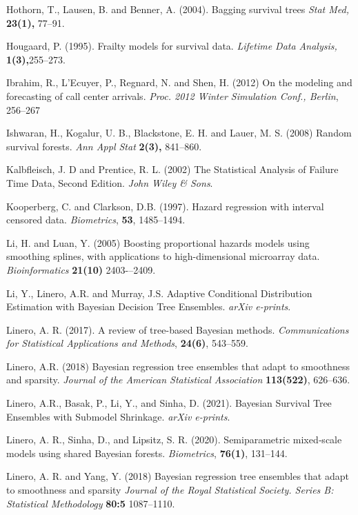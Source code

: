 \documentclass[11pt]{article}
\begin{document}
\begin{thebibliography}{}
\bibitem{ }	Hothorn, T., Lausen, B. and Benner, A. (2004). Bagging survival trees \textit{Stat Med,} \textbf{23(1),} 77--91.

\bibitem{ }	Hougaard, P. (1995). Frailty models for survival data. \textit{Lifetime Data Analysis,} \textbf{1(3),}255--273.

\bibitem{ } Ibrahim, R., L’Ecuyer, P., Regnard, N. and Shen, H. (2012) On the modeling
and forecasting of call center arrivals. \textit{Proc. 2012 Winter Simulation
Conf., Berlin}, 256--267

\bibitem{ }	 Ishwaran, H., Kogalur, U. B., Blackstone, E. H. and Lauer, M. S. (2008) Random survival forests. \textit{Ann Appl Stat} \textbf{2(3),} 841--860.

\bibitem{ } Kalbfleisch, J. D and Prentice, R. L. (2002) The Statistical Analysis of Failure Time Data, Second Edition. \textit{John Wiley \& Sons}.

\bibitem{ } Kooperberg, C. and Clarkson, D.B. (1997). Hazard regression with interval censored data.
\textit{Biometrics}, \textbf{53}, 1485--1494.

\bibitem{ }	 Li, H. and Luan, Y. (2005) Boosting proportional hazards models using smoothing splines, with applications to high-dimensional microarray data. \textit{Bioinformatics} \textbf{21(10)} 2403-–2409.	 

\bibitem{ } Li, Y., Linero, A.R. and Murray, J.S. Adaptive Conditional Distribution Estimation with Bayesian Decision Tree Ensembles. \textit{arXiv e-prints}.

\bibitem{ } Linero, A. R. (2017). A review of tree-based Bayesian methods. \textit{Communications for Statistical Applications and Methods}, \textbf{24(6)}, 543--559.

\bibitem{ } Linero, A.R. (2018) Bayesian regression tree ensembles that adapt to smoothness and sparsity. \textit{Journal of the American Statistical Association} \textbf{113(522)}, 626--636.

\bibitem{ } Linero, A.R., Basak, P., Li, Y., and Sinha, D. (2021). Bayesian Survival Tree Ensembles with Submodel Shrinkage. \textit{arXiv e-prints}.

\bibitem{ } Linero, A. R., Sinha, D., and Lipsitz, S. R. (2020). Semiparametric mixed‐scale models using shared Bayesian forests. \textit{Biometrics}, \textbf{76(1)}, 131--144.



\bibitem{ } Linero, A. R. and Yang, Y. (2018) Bayesian regression tree ensembles that adapt to smoothness and sparsity \textit{Journal of the Royal Statistical Society. Series B: Statistical Methodology} \textbf{80:5} 1087--1110.


\end{thebibliography}
\end{document}
